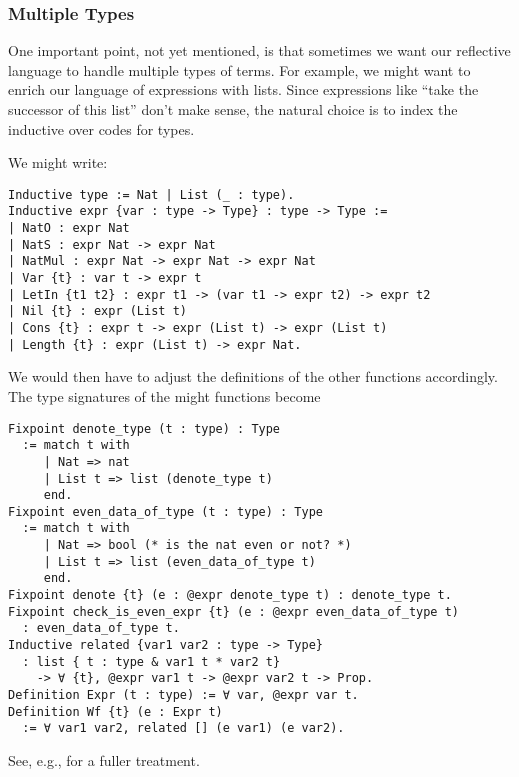 \subsubsection{Multiple Types} \label{sec:multiple-types-ASTs}
One important point, not yet mentioned, is that sometimes we want our reflective language to handle multiple types of terms.
For example, we might want to enrich our language of expressions with lists.
Since expressions like ``take the successor of this list'' don't make sense, the natural choice is to index the inductive over codes for types.

We might write:
\begin{verbatim}
Inductive type := Nat | List (_ : type).
Inductive expr {var : type -> Type} : type -> Type :=
| NatO : expr Nat
| NatS : expr Nat -> expr Nat
| NatMul : expr Nat -> expr Nat -> expr Nat
| Var {t} : var t -> expr t
| LetIn {t1 t2} : expr t1 -> (var t1 -> expr t2) -> expr t2
| Nil {t} : expr (List t)
| Cons {t} : expr t -> expr (List t) -> expr (List t)
| Length {t} : expr (List t) -> expr Nat.
\end{verbatim}
We would then have to adjust the definitions of the other functions accordingly.
The type signatures of the might functions become

\begin{verbatim}
Fixpoint denote_type (t : type) : Type
  := match t with
     | Nat => nat
     | List t => list (denote_type t)
     end.
Fixpoint even_data_of_type (t : type) : Type
  := match t with
     | Nat => bool (* is the nat even or not? *)
     | List t => list (even_data_of_type t)
     end.
Fixpoint denote {t} (e : @expr denote_type t) : denote_type t.
Fixpoint check_is_even_expr {t} (e : @expr even_data_of_type t)
  : even_data_of_type t.
Inductive related {var1 var2 : type -> Type}
  : list { t : type & var1 t * var2 t}
    -> ∀ {t}, @expr var1 t -> @expr var2 t -> Prop.
Definition Expr (t : type) := ∀ var, @expr var t.
Definition Wf {t} (e : Expr t)
  := ∀ var1 var2, related [] (e var1) (e var2).
\end{verbatim}

See, e.g., \autocite{PhoasICFP08} for a fuller treatment.

